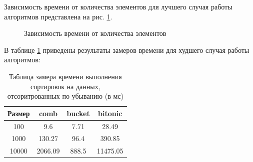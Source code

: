 \documentclass[12pt]{report}
\begin{document}
	Зависимость времени от количества элементов для лучшего случая работы алгоритмов представлена на рис. \ref{ris1}.

	\begin{center}
		\begin{figure}[H]
		\center
		\caption{Зависимость времени от количества элементов}
		\label{ris1}
		\end{figure}
	\end{center}
	
	В таблице \ref{table:t2} приведены результаты замеров времени для худшего случая работы алгоритмов:
	
	\begin{table} [H]
		\caption{Таблица замера времени выполнения сортировок на данных, отсоритрованных по убыванию (в мс)}
		\label{table:t2}
		\begin{center}
			\begin{tabular}{|c | c | c | c|}
				
				\hline
				
				Размер & comb & bucket & bitonic  \\ [0.5ex]
				
				\hline
				
				100 & 9.6 & 7.71 & 28.49 \\ 
				
				\hline 
				
				1000 & 130.27 & 96.4 & 390.85 \\ 
				
				\hline 
				
				10000 & 2066.09 & 888.5 & 11475.05 \\ 
				
				\hline 
				
			\end{tabular}
		\end{center}
	\end{table}
	
\end{document}
